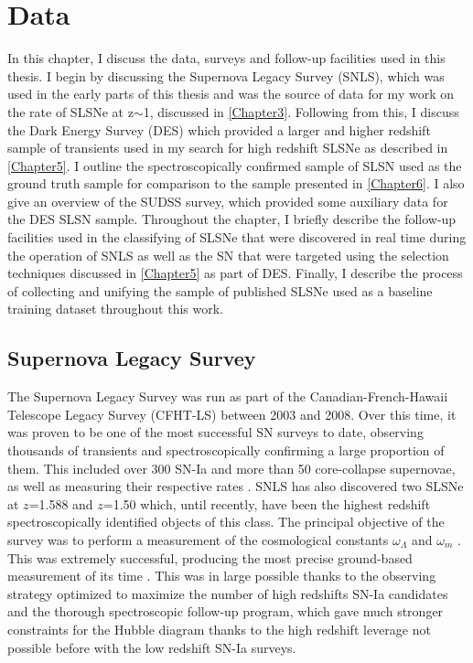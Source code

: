 \chapter{Data}
\label{Chapter2}

In this chapter, I discuss the data, surveys and follow-up facilities used in this thesis. I begin by discussing the Supernova Legacy Survey (SNLS), which was used in the early parts of this thesis and was the source of data for my work on the rate of SLSNe at z$\sim$1, discussed in \cref{Chapter3}. Following from this, I discuss the Dark Energy Survey (DES) which provided a larger and higher redshift sample of transients used in my search for high redshift SLSNe as described in \cref{Chapter5}. I outline the spectroscopically confirmed sample of SLSN used as the ground truth sample for comparison to the sample presented in \cref{Chapter6}. I also give an overview of the SUDSS survey, which provided some auxiliary data for the DES SLSN sample. Throughout the chapter, I briefly describe the follow-up facilities used in the classifying of SLSNe that were discovered in real time during the operation of SNLS as well as the SN that were targeted using the selection techniques discussed in \cref{Chapter5} as part of DES. Finally, I describe the process of collecting and unifying the sample of published SLSNe used as a baseline training dataset throughout this work.

\section{Supernova Legacy Survey}
The Supernova Legacy Survey \citep{Boulade2003,Pritchet2004} was run as part of the Canadian-French-Hawaii Telescope Legacy Survey (CFHT-LS) between 2003 and 2008. Over this time, it was proven to be one of the most successful SN surveys to date, observing thousands of transients and spectroscopically confirming a large proportion of them. This included over 300 SN-Ia \citep{Perrett2010} and more than 50 core-collapse supernovae, as well as measuring their respective rates \citep{Perrett2012,Bazin2009}. SNLS has also discovered two SLSNe at $z$=1.588 and $z$=1.50 \citep{Howell2013} which, until recently, have been the highest redshift spectroscopically identified objects of this class. The principal objective of the survey was to perform a measurement of the cosmological constants $\omega_{\Lambda}$ and $\omega_{m}$ \citep{Astier2006}. This was extremely successful, producing the most precise ground-based measurement of its time \citep{Sullivan2006}. This was in large possible thanks to the observing strategy optimized to maximize the number of high redshifts SN-Ia candidates and the thorough spectroscopic follow-up program, which gave much stronger constraints for the Hubble diagram thanks to the high redshift leverage not possible before with the low redshift SN-Ia surveys.

